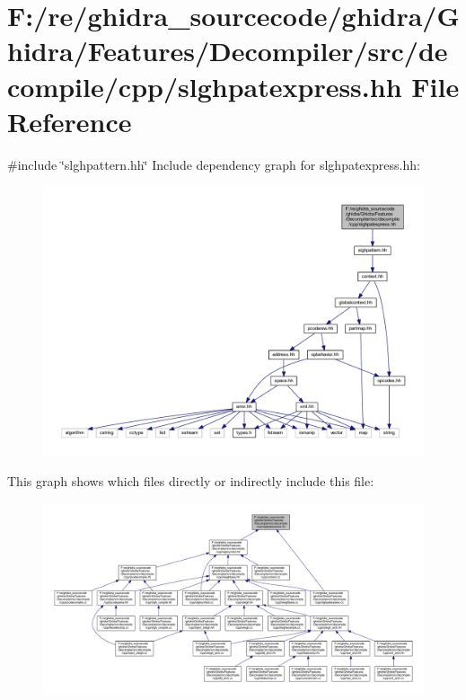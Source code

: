 \hypertarget{slghpatexpress_8hh}{}\section{F\+:/re/ghidra\+\_\+sourcecode/ghidra/\+Ghidra/\+Features/\+Decompiler/src/decompile/cpp/slghpatexpress.hh File Reference}
\label{slghpatexpress_8hh}
{\ttfamily \#include \char`\"{}slghpattern.\+hh\char`\"{}}\newline
Include dependency graph for slghpatexpress.\+hh\+:
\nopagebreak
\begin{figure}[H]
\begin{center}
\leavevmode
\includegraphics[width=350pt]{slghpatexpress_8hh__incl}
\end{center}
\end{figure}
This graph shows which files directly or indirectly include this file\+:
\nopagebreak
\begin{figure}[H]
\begin{center}
\leavevmode
\includegraphics[width=350pt]{slghpatexpress_8hh__dep__incl}
\end{center}
\end{figure}
